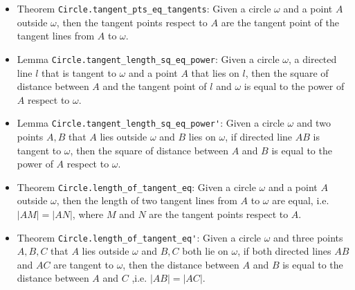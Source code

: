 \documentclass[12pt]{amsart}
\begin{document}
\begin{itemize}
    \item Theorem \verb|Circle.tangent_pts_eq_tangents|: Given a circle $\omega$ and a point $A$ outside $\omega$, then the tangent points respect to $A$ are the tangent point of the tangent lines from $A$ to $\omega$.
    \item Lemma \verb|Circle.tangent_length_sq_eq_power|: Given a circle $\omega$, a directed line $l$ that is tangent to $\omega$ and a point $A$ that lies on $l$, then the square of distance between $A$ and the tangent point of $l$ and $\omega$ is equal to the power of $A$ respect to $\omega$.
    \item Lemma \verb|Circle.tangent_length_sq_eq_power'|: Given a circle $\omega$ and two points $A,B$ that $A$ lies outside $\omega$ and $B$ lies on $\omega$, if directed line $AB$ is tangent to $\omega$, then the square of distance between $A$ and $B$ is equal to the power of $A$ respect to $\omega$.
    \item Theorem \verb|Circle.length_of_tangent_eq|: Given a circle $\omega$ and a point $A$ outside $\omega$, then the length of two tangent lines from $A$ to $\omega$ are equal, i.e. $|AM|=|AN|$, where $M$ and $N$ are the tangent points respect to $A$.
    \item Theorem \verb|Circle.length_of_tangent_eq'|: Given a circle $\omega$ and three points $A,B,C$ that $A$ lies outside $\omega$ and $B,C$ both lie on $\omega$, if both directed lines $AB$ and $AC$ are tangent to $\omega$, then the distance between $A$ and $B$ is equal to the distance between $A$ and $C$ ,i.e. $|AB|=|AC|$.
\end{itemize}
\end{document}
